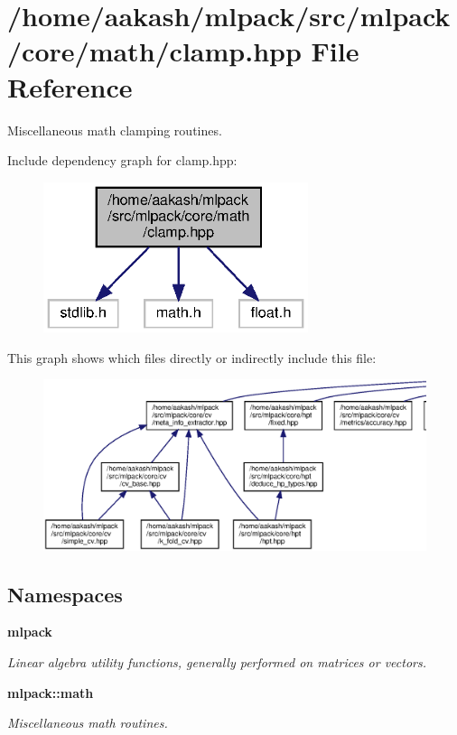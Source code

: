 \section{/home/aakash/mlpack/src/mlpack/core/math/clamp.hpp File Reference}
\label{clamp_8hpp}


Miscellaneous math clamping routines.  


Include dependency graph for clamp.\+hpp\+:
\nopagebreak
\begin{figure}[H]
\begin{center}
\leavevmode
\includegraphics[width=220pt]{clamp_8hpp__incl}
\end{center}
\end{figure}
This graph shows which files directly or indirectly include this file\+:
\nopagebreak
\begin{figure}[H]
\begin{center}
\leavevmode
\includegraphics[width=350pt]{clamp_8hpp__dep__incl}
\end{center}
\end{figure}
\subsection*{Namespaces}
\begin{DoxyCompactItemize}
\item 
 \textbf{ mlpack}
\begin{DoxyCompactList}\small\item\em Linear algebra utility functions, generally performed on matrices or vectors. \end{DoxyCompactList}\item 
 \textbf{ mlpack\+::math}
\begin{DoxyCompactList}\small\item\em Miscellaneous math routines. \end{DoxyCompactList}\end{DoxyCompactItemize}

